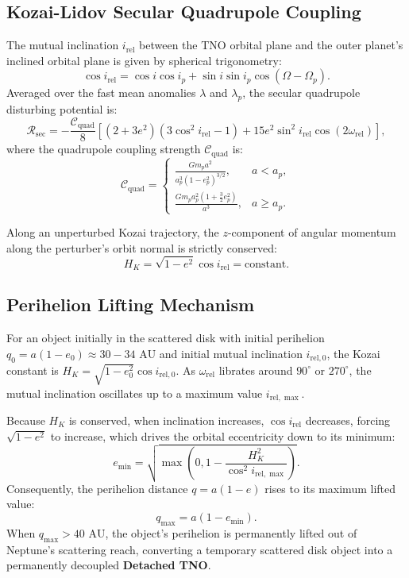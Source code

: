 \documentclass[11pt,a4paper]{article}
\begin{document}
\subsection{Kozai-Lidov Secular Quadrupole Coupling}
The mutual inclination $i_{\text{rel}}$ between the TNO orbital plane and the outer planet's inclined orbital plane is given by spherical trigonometry:
\begin{equation}
\cos i_{\text{rel}} = \cos i \cos i_p + \sin i \sin i_p \cos(\Omega - \Omega_p).
\end{equation}
Averaged over the fast mean anomalies $\lambda$ and $\lambda_p$, the secular quadrupole disturbing potential is:
\begin{equation}
\mathcal{R}_{\text{sec}} = -\frac{\mathcal{C}_{\text{quad}}}{8} \left[ (2 + 3e^2)(3\cos^2 i_{\text{rel}} - 1) + 15 e^2 \sin^2 i_{\text{rel}} \cos(2\omega_{\text{rel}}) \right],
\end{equation}
where the quadrupole coupling strength $\mathcal{C}_{\text{quad}}$ is:
\begin{equation}
\mathcal{C}_{\text{quad}} = 
\begin{cases}
\frac{G m_p a^2}{a_p^3 (1 - e_p^2)^{3/2}}, & a < a_p, \\[1.2ex]
\frac{G m_p a_p^2 (1 + \frac{3}{2}e_p^2)}{a^3}, & a \ge a_p.
\end{cases}
\end{equation}

Along an unperturbed Kozai trajectory, the $z$-component of angular momentum along the perturber's orbit normal is strictly conserved:
\begin{equation}
H_K = \sqrt{1 - e^2} \cos i_{\text{rel}} = \text{constant}.
\end{equation}

\subsection{Perihelion Lifting Mechanism}
For an object initially in the scattered disk with initial perihelion $q_0 = a(1 - e_0) \approx 30 - 34\text{ AU}$ and initial mutual inclination $i_{\text{rel}, 0}$, the Kozai constant is $H_K = \sqrt{1 - e_0^2}\cos i_{\text{rel}, 0}$. As $\omega_{\text{rel}}$ librates around $90^\circ$ or $270^\circ$, the mutual inclination oscillates up to a maximum value $i_{\text{rel}, \max}$.

Because $H_K$ is conserved, when inclination increases, $\cos i_{\text{rel}}$ decreases, forcing $\sqrt{1 - e^2}$ to increase, which drives the orbital eccentricity down to its minimum:
\begin{equation}
e_{\min} = \sqrt{\max\left(0, 1 - \frac{H_K^2}{\cos^2 i_{\text{rel}, \max}}\right)}.
\end{equation}
Consequently, the perihelion distance $q = a(1 - e)$ rises to its maximum lifted value:
\begin{equation}
q_{\max} = a(1 - e_{\min}).
\end{equation}
When $q_{\max} > 40\text{ AU}$, the object's perihelion is permanently lifted out of Neptune's scattering reach, converting a temporary scattered disk object into a permanently decoupled \textbf{Detached TNO}.
\end{document}
